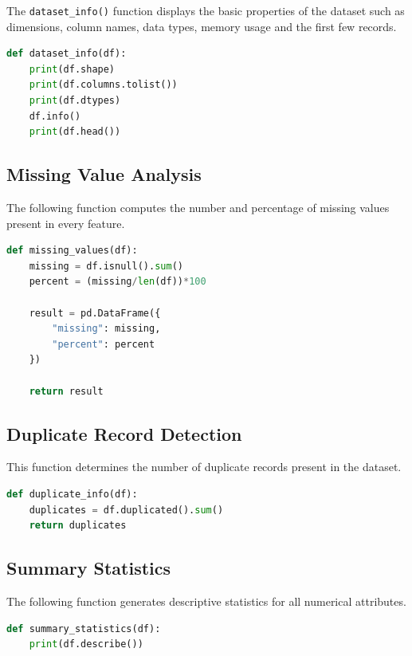 \documentclass[12pt,a4paper]{article}
\begin{document}
The \texttt{dataset\_info()} function displays the basic properties of the
dataset such as dimensions, column names, data types, memory usage and the
first few records.

\begin{lstlisting}[language=Python,caption={Dataset Information Function}]
def dataset_info(df):
    print(df.shape)
    print(df.columns.tolist())
    print(df.dtypes)
    df.info()
    print(df.head())
\end{lstlisting}


\subsection{Missing Value Analysis}

The following function computes the number and percentage of missing values
present in every feature.

\begin{lstlisting}[language=Python,caption={Missing Value Analysis}]
def missing_values(df):
    missing = df.isnull().sum()
    percent = (missing/len(df))*100

    result = pd.DataFrame({
        "missing": missing,
        "percent": percent
    })

    return result
\end{lstlisting}


\subsection{Duplicate Record Detection}

This function determines the number of duplicate records present in the dataset.

\begin{lstlisting}[language=Python,caption={Duplicate Detection}]
def duplicate_info(df):
    duplicates = df.duplicated().sum()
    return duplicates
\end{lstlisting}


\subsection{Summary Statistics}

The following function generates descriptive statistics for all numerical
attributes.

\begin{lstlisting}[language=Python,caption={Summary Statistics}]
def summary_statistics(df):
    print(df.describe())
\end{lstlisting}
\end{document}
